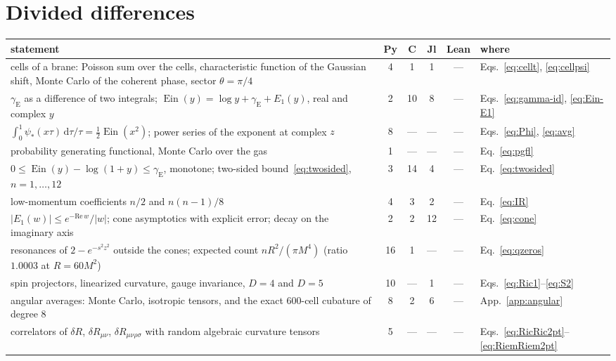 \documentclass[a4paper,11pt]{article}
\newcommand{\dd}{\mathrm{d}}
\newcommand{\Ein}{\operatorname{Ein}}
\newcommand{\gE}{\gamma_{\mathrm E}}
\begin{document}
\section{Divided differences}
\label{app:dd}

\begin{table}[t]
\centering
\setlength{\tabcolsep}{4pt}
\small\begin{adjustbox}{max width=\linewidth}\begin{tabular}{p{10.6cm}ccccl}
statement & Py & C & Jl & Lean & where\\
\hline
cells of a brane: Poisson sum over the cells, characteristic function of the Gaussian shift, Monte Carlo of the coherent phase, sector $\theta=\pi/4$ & 4 & 1 & 1 & --- & Eqs.~\eqref{eq:cellt}, \eqref{eq:cellpsi}\\
$\gE$ as a difference of two integrals; $\Ein(y)=\log y+\gE+E_1(y)$, real and complex $y$ & 2 & 10 & 8 & --- & Eqs.~\eqref{eq:gamma-id}, \eqref{eq:Ein-E1}\\
$\int_0^1\psi_*(x\tau)\,\dd\tau/\tau=\frac12\Ein(x^2)$; power series of the exponent at complex $z$ & 8 & --- & --- & --- & Eqs.~\eqref{eq:Phi}, \eqref{eq:avg}\\
probability generating functional, Monte Carlo over the gas & 1 & --- & --- & --- & Eq.~\eqref{eq:pgfl}\\
$0\le\Ein(y)-\log(1+y)\le\gE$, monotone; two-sided bound~\eqref{eq:twosided}, $n=1,\dots,12$ & 3 & 14 & 4 & --- & Eq.~\eqref{eq:twosided}\\
low-momentum coefficients $n/2$ and $n(n-1)/8$ & 4 & 3 & 2 & --- & Eq.~\eqref{eq:IR}\\
$|E_1(w)|\le e^{-\mathrm{Re}\,w}/|w|$; cone asymptotics with explicit error; decay on the imaginary axis & 2 & 2 & 12 & --- & Eq.~\eqref{eq:cone}\\
resonances of $2-e^{-s^2z^2}$ outside the cones; expected count $nR^2/(\pi M^4)$ (ratio $1.0003$ at $R=60M^2$) & 16 & 1 & --- & --- & Eq.~\eqref{eq:qzeros}\\
spin projectors, linearized curvature, gauge invariance, $D=4$ and $D=5$ & 10 & --- & 1 & --- & Eqs.~\eqref{eq:Ric1}--\eqref{eq:S2}\\
angular averages: Monte Carlo, isotropic tensors, and the exact 600-cell cubature of degree $8$ & 8 & 2 & 6 & --- & App.~\ref{app:angular}\\
correlators of $\delta R$, $\delta R_{\mu\nu}$, $\delta R_{\mu\nu\rho\sigma}$ with random algebraic curvature tensors & 5 & --- & --- & --- & Eqs.~\eqref{eq:RicRic2pt}--\eqref{eq:RiemRiem2pt}\\

\end{tabular}
\end{adjustbox}
\end{table}
\end{document}
